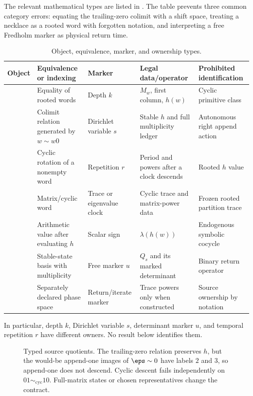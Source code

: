 The relevant mathematical types are listed in
.  The table prevents three common category errors:
equating the trailing-zero colimit with a shift space, treating a necklace as
a rooted word with forgotten notation, and interpreting a free Fredholm
marker as physical return time.

\begin{table}[htbp]
\centering
\caption{Object, equivalence, marker, and ownership types.}
\label{tab:type-ledger}
\scriptsize
\setlength{\tabcolsep}{3pt}
\begin{tabularx}{\textwidth}{@{}P{.18\textwidth}YYYY@{}}
\toprule
Object & Equivalence or indexing & Marker & Legal data/operator & Prohibited
identification \\
\midrule
{}
& Equality of rooted words
& Depth $k$
& $M_w$, first column, $h(w)$
& Cyclic primitive class \\
& Colimit relation generated by $w\sim w0$
& Dirichlet variable $s$
& Stable $h$ and full multiplicity ledger
& Autonomous right append action \\
& Cyclic rotation of a nonempty word
& Repetition $r$
& Period and powers after a clock descends
& Rooted $h$ value \\
& Matrix/cyclic word
& Trace or eigenvalue clock
& Cyclic trace and matrix-power data
& Frozen rooted partition trace \\
\newline{}
& Arithmetic value after evaluating $h$
& Scalar sign
& $\lambda(h(w))$
& Endogenous symbolic cocycle \\
\newline{}
& Stable-state basis with multiplicity
& Free marker $u$
& $Q_s$ and its marked determinant
& Binary return operator \\
\newline{}
& Separately declared phase space
& Return/iterate marker
& Trace powers only when constructed
& Source ownership by notation \\
\bottomrule
\end{tabularx}
\end{table}

In particular, depth $k$, Dirichlet variable $s$, determinant marker $u$, and
temporal repetition $r$ have different owners.  No result below identifies
them.

\begin{figure}[H]
  \centering
  \resizebox{\textwidth}{!}{}
  \caption{Typed source quotients. The trailing-zero relation preserves
  $h$, but the would-be append-one images of $\eps\sim0$ have labels $2$ and
  $3$, so append-one does not descend. Cyclic descent fails independently on
  $01\sim_{\mathrm{cyc}}10$. Full-matrix states or chosen representatives
  change the contract.}
  \label{fig:rooted-state}
\end{figure}
